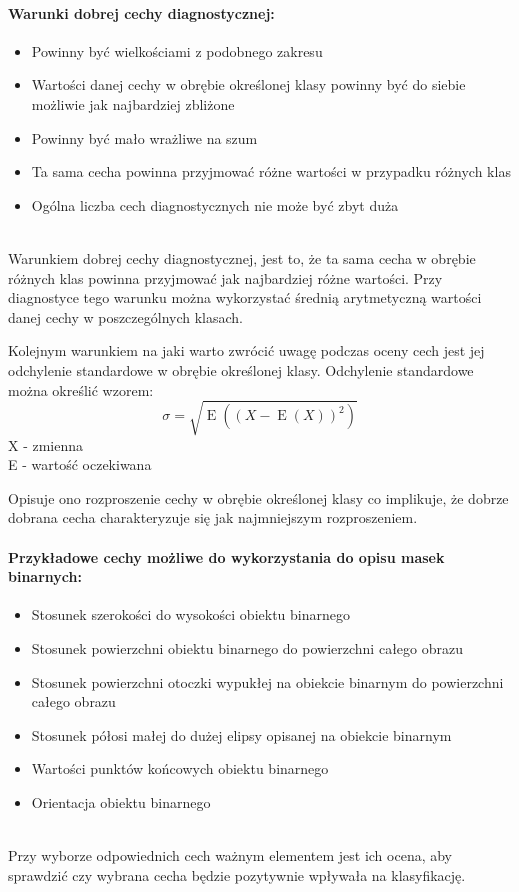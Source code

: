 \documentclass[a4paper,12pt,twoside,openany]{report}
\begin{document}
\paragraph{Warunki dobrej cechy diagnostycznej: }
\begin{itemize}
	\item Powinny być wielkościami z podobnego zakresu
	\item Wartości danej cechy w obrębie określonej klasy powinny być do siebie możliwie jak najbardziej zbliżone
	\item Powinny być mało wrażliwe na szum
	\item Ta sama cecha powinna przyjmować różne wartości w przypadku różnych klas
	\item Ogólna liczba cech diagnostycznych nie może być zbyt duża \cite{Osowski}
\end{itemize}
\mbox{} \\
Warunkiem dobrej cechy diagnostycznej, jest to, że ta sama cecha w obrębie różnych klas powinna przyjmować jak najbardziej różne wartości. Przy diagnostyce tego warunku można wykorzystać średnią arytmetyczną wartości danej cechy w poszczególnych klasach.

Kolejnym warunkiem na jaki warto zwrócić uwagę podczas oceny cech jest jej odchylenie standardowe w obrębie określonej klasy. Odchylenie standardowe można określić wzorem: 
\begin{equation}
	 \sigma = {\sqrt {\operatorname {E} ((X-\operatorname {E} (X))^{2})}} 
\end{equation}
X - zmienna \\
E - wartość oczekiwana 


Opisuje ono rozproszenie cechy w obrębie określonej klasy co implikuje, że dobrze dobrana cecha charakteryzuje się jak najmniejszym rozproszeniem.

\paragraph{Przykładowe cechy możliwe do wykorzystania do opisu masek binarnych: }
\begin{itemize}
	\item Stosunek szerokości do wysokości obiektu binarnego
	\item Stosunek powierzchni obiektu binarnego do powierzchni całego obrazu
	\item Stosunek powierzchni otoczki wypukłej na obiekcie binarnym do powierzchni całego obrazu
	\item Stosunek półosi małej do dużej elipsy opisanej na obiekcie binarnym 
	\item Wartości punktów końcowych obiektu binarnego
	\item Orientacja obiektu binarnego
\end{itemize}
\mbox{} \\
Przy wyborze odpowiednich cech ważnym elementem jest ich ocena, aby sprawdzić czy wybrana cecha będzie pozytywnie wpływała na klasyfikację.
\end{document}
